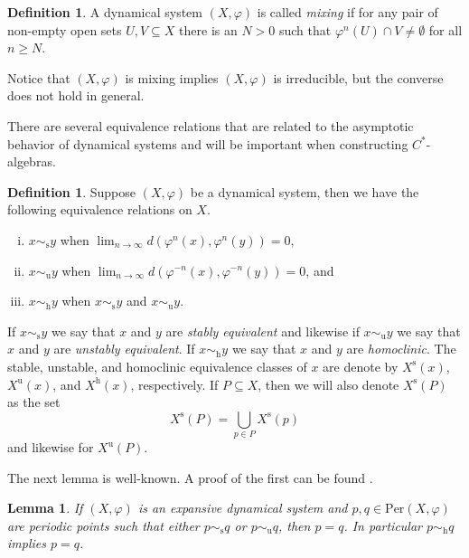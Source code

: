 \documentclass{amsart}
\newcommand{\Per}{\text{Per}}
\theoremstyle{plain}
\newtheorem{lemma}[theorem]{Lemma}
\theoremstyle{definition}
\newtheorem{definition}[theorem]{Definition}
\theoremstyle{remark}
\begin{document}
\begin{definition}
A dynamical system $(X,\varphi)$ is called \emph{mixing} if for any pair of non-empty open sets $U, V \subseteq X$ there is an $N > 0$ such that $\varphi^n(U) \cap V \neq \emptyset$ for all $n \geq N$.  
\end{definition}

Notice that $(X,\varphi)$ is mixing implies $(X,\varphi)$ is irreducible, but the converse does not hold in general.  

There are several equivalence relations that are related to the asymptotic behavior of dynamical systems and will be important when constructing $C^\ast$-algebras.
\begin{definition}
Suppose $(X,\varphi)$ be a dynamical system, then we have the following equivalence relations on $X$.
\begin{enumerate}[(i)]
    \item $x \sim_\text{s} y$ when $\displaystyle \lim_{n\to\infty} d(\varphi^n(x), \varphi^n(y)) = 0$,
    \item $x \sim_\text{u} y$ when $\displaystyle \lim_{n\to\infty} d(\varphi^{-n}(x), \varphi^{-n}(y)) = 0$, and
    \item $x \sim_\text{h} y$ when $x \sim_\text{s} y$ and $x \sim_\text{u} y$.
\end{enumerate}
If $x \sim_\text{s} y$ we say that $x$ and $y$ are \emph{stably equivalent} and likewise if $x \sim_\text{u} y$ we say that $x$ and $y$ are \emph{unstably equivalent}.  If $x \sim_\text{h} y$ we say that $x$ and $y$ are \emph{homoclinic}.  The stable, unstable, and homoclinic equivalence classes of $x$ are denote by $X^\text{s}(x)$, $X^\text{u}(x)$, and $X^\text{h}(x)$, respectively.  If $P \subseteq X$, then we will also denote $X^\text{s}(P)$ as the set \[ X^\text{s}(P) = \bigcup_{p \in P} X^\text{s}(p) \] and likewise for $X^\text{u}(P)$.
\end{definition}

The next lemma is well-known. A proof of the first can be found \cite{DeeSto}.
\begin{lemma}\label{lem:periodic-h-implies-equals}
If $(X,\varphi)$ is an expansive dynamical system and $p , q \in \Per(X,\varphi)$ are periodic points such that either $p \sim_\text{s} q$ or $p \sim_\text{u} q$, then $p = q$.  In particular $p \sim_\text{h} q$ implies $p = q$.
\end{lemma}
\end{document}
